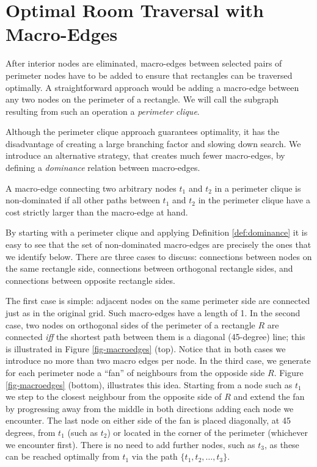 \section{Optimal Room Traversal with Macro-Edges}

After interior nodes are eliminated, macro-edges between selected pairs of
perimeter nodes have to be added to ensure that rectangles can be traversed
optimally.  A straightforward approach would be adding a macro-edge between any
two nodes on the perimeter of a rectangle.  We will call the subgraph resulting
from such an operation a \emph{perimeter clique}.

Although the perimeter clique approach guarantees optimality, it has the
disadvantage of creating a large branching factor and slowing down search.  We
introduce an alternative strategy, that creates much fewer macro-edges, by
defining a \emph{dominance} relation between macro-edges.
%

\begin{definition}
\label{def:dominance}
A macro-edge connecting two arbitrary nodes $t_1$ and $t_2$ in a perimeter
clique is non-dominated if all other paths between $t_1$ and $t_2$ in the
perimeter clique have a cost strictly larger than the macro-edge at hand.
\end{definition}

By starting with a perimeter clique and applying Definition \ref{def:dominance}
it is easy to see that the set of non-dominated macro-edges are precisely the
ones that we identify below.  There are three cases to discuss: connections
between nodes on the same rectangle side, connections between orthogonal
rectangle sides, and connections between opposite rectangle sides.

The first case is simple: adjacent nodes on the same perimeter side are connected
just as in the original grid. Such macro-edges have a length of 1.
In the second case, two nodes on orthogonal sides of the perimeter of a rectangle
$R$ are connected \emph{iff} the shortest path between them is a diagonal
(45-degree) line; this is illustrated in Figure \ref{fig-macroedges} (top).
Notice that in both cases we introduce no more than two macro edges per node.
In the third case, we generate for each perimeter node a ``fan'' of neighbours
from the opposide side $R$.  Figure \ref{fig-macroedges} (bottom), illustrates
this idea.  Starting from a node such as $t_{1}$ we step to the closest
neighbour from the opposite side of $R$ and extend the fan by progressing away
from the middle in both directions adding each node we encounter.  The last node
on either side of the fan is placed diagonally, at 45 degrees, from $t_{1}$
(such as $t_{2}$) or located in the corner of the perimeter (whichever we
encounter first).  There is no need to add further nodes, such as $t_{3}$, as
these can be reached optimally from $t_1$ via the path $\lbrace t_1, t_2, \dots,
t_3\rbrace$.

